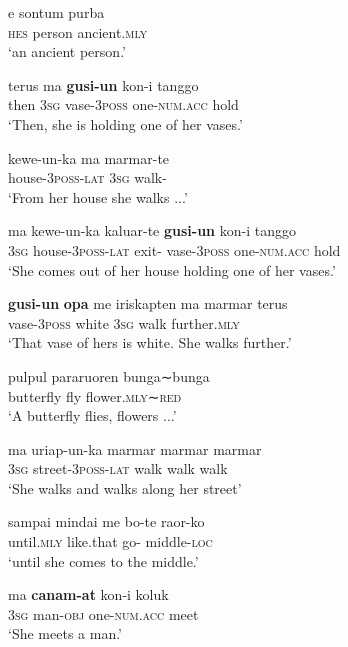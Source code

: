 \documentclass[output=paper,colorlinks,citecolor=brown]{langscibook}
\begin{document}
\ex\label{exe:fishnarr:d} \gll e sontum purba\\
\textsc{hes} person ancient.\textsc{mly}\\
\glt `an ancient person.'

\ex\label{exe:fishnarr:e} \gll terus ma \textbf{gusi-un} kon-i tanggo\\
then \textsc{3sg} vase-\textsc{3poss} one-\textsc{num.acc} hold\\
\glt `Then, she is holding one of her vases.'

\ex\label{exe:fishnarr:f} \gll kewe-un-ka ma marmar-te\\
house-\textsc{3poss-lat} \textsc{3sg} walk-{\glte}\\
\glt `From her house she walks ...'

\ex\label{exe:fishnarr:g} \gll ma kewe-un-ka kaluar-te \textbf{gusi-un} kon-i tanggo\\
\textsc{3sg} house-\textsc{3poss-lat} exit-{\glte} vase-\textsc{3poss} one-\textsc{num.acc} hold\\
\glt `She comes out of her house holding one of her vases.'

\ex\label{exe:fishnarr:h} \gll \textbf{gusi-un} \textbf{opa} me iriskapten ma marmar terus\\
vase-\textsc{3poss} {\glopa} {\glme} white \textsc{3sg} walk further.\textsc{mly}\\
\glt `That vase of hers is white. She walks further.'

\ex\label{exe:fishnarr:i} \gll pulpul pararuoren bunga∼bunga\\
butterfly fly flower.\textsc{mly}∼\textsc{red}\\
\glt `A butterfly flies, flowers ...'

\ex\label{exe:fishnarr:j} \gll ma uriap-un-ka marmar marmar marmar\\
\textsc{3sg} street-\textsc{3poss-lat} walk walk walk\\
\glt`She walks and walks along her street'

\ex\label{exe:fishnarr:k} \gll sampai mindai me bo-te raor-ko\\
until.\textsc{mly} like.that {\glme} go-{\glte} middle-\textsc{loc}\\
\glt`until she comes to the middle.'

\ex\label{exe:fishnarr:l} \gll ma \textbf{canam-at} kon-i koluk\\
\textsc{3sg} man-\textsc{obj} one-\textsc{num.acc} meet\\
\glt`She meets a man.'
\end{document}
